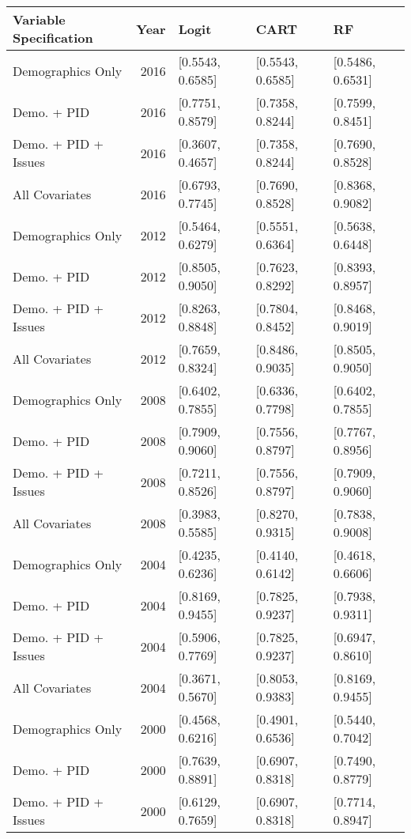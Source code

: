 \begin{longtable}{lrlll}
  \toprule
Variable Specification & Year & Logit & CART & RF \\ 
  \midrule
Demographics Only & 2016 & [0.5543, 0.6585] & [0.5543, 0.6585] & [0.5486, 0.6531] \\ 
  Demo. + PID & 2016 & [0.7751, 0.8579] & [0.7358, 0.8244] & [0.7599, 0.8451] \\ 
  Demo. + PID + Issues & 2016 & [0.3607, 0.4657] & [0.7358, 0.8244] & [0.7690, 0.8528] \\ 
  All Covariates & 2016 & [0.6793, 0.7745] & [0.7690, 0.8528] & [0.8368, 0.9082] \\ 
  Demographics Only & 2012 & [0.5464, 0.6279] & [0.5551, 0.6364] & [0.5638, 0.6448] \\ 
  Demo. + PID & 2012 & [0.8505, 0.9050] & [0.7623, 0.8292] & [0.8393, 0.8957] \\ 
  Demo. + PID + Issues & 2012 & [0.8263, 0.8848] & [0.7804, 0.8452] & [0.8468, 0.9019] \\ 
  All Covariates & 2012 & [0.7659, 0.8324] & [0.8486, 0.9035] & [0.8505, 0.9050] \\ 
  Demographics Only & 2008 & [0.6402, 0.7855] & [0.6336, 0.7798] & [0.6402, 0.7855] \\ 
  Demo. + PID & 2008 & [0.7909, 0.9060] & [0.7556, 0.8797] & [0.7767, 0.8956] \\ 
  Demo. + PID + Issues & 2008 & [0.7211, 0.8526] & [0.7556, 0.8797] & [0.7909, 0.9060] \\ 
  All Covariates & 2008 & [0.3983, 0.5585] & [0.8270, 0.9315] & [0.7838, 0.9008] \\ 
  Demographics Only & 2004 & [0.4235, 0.6236] & [0.4140, 0.6142] & [0.4618, 0.6606] \\ 
  Demo. + PID & 2004 & [0.8169, 0.9455] & [0.7825, 0.9237] & [0.7938, 0.9311] \\ 
  Demo. + PID + Issues & 2004 & [0.5906, 0.7769] & [0.7825, 0.9237] & [0.6947, 0.8610] \\ 
  All Covariates & 2004 & [0.3671, 0.5670] & [0.8053, 0.9383] & [0.8169, 0.9455] \\ 
  Demographics Only & 2000 & [0.4568, 0.6216] & [0.4901, 0.6536] & [0.5440, 0.7042] \\ 
  Demo. + PID & 2000 & [0.7639, 0.8891] & [0.6907, 0.8318] & [0.7490, 0.8779] \\ 
  Demo. + PID + Issues & 2000 & [0.6129, 0.7659] & [0.6907, 0.8318] & [0.7714, 0.8947] \\ 

\end{longtable}
